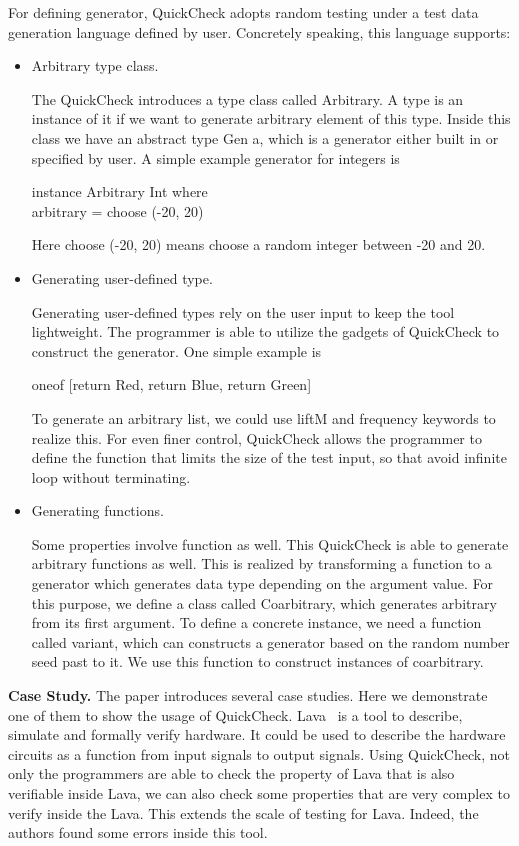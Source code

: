 \documentclass[12pt]{article}
\begin{document}
For defining generator, QuickCheck adopts random testing under a test data generation language defined by user. Concretely speaking, this language supports:
\begin{itemize}
\item Arbitrary type class.

The QuickCheck introduces a type class called Arbitrary. A type is an instance of it if we want to generate arbitrary element of this type. Inside this class we have an abstract type Gen a, which is a generator either built in or specified by user. A simple example generator for integers is
\begin{center}
	instance Arbitrary Int where\\
	arbitrary = choose (-20, 20)
\end{center}
Here choose (-20, 20) means choose a random integer between -20 and 20.

\item Generating user-defined type.

Generating user-defined types rely on the user input to keep the tool lightweight. The programmer is able to utilize the gadgets of QuickCheck to construct the generator. One simple example is
\begin{center}
	oneof [return Red, return Blue, return Green]
\end{center}

To generate an arbitrary list, we could use liftM and frequency keywords to realize this. For even finer control, QuickCheck allows the programmer to define the function that limits the size of the test input, so that avoid infinite loop without terminating.


\item Generating functions.

Some properties involve function as well. This QuickCheck is able to generate arbitrary functions as well. This is realized by transforming a function to a generator which generates data type depending on the argument value. For this purpose, we define a class called Coarbitrary, which generates arbitrary from its first argument. To define a concrete instance, we need a function called variant, which can constructs a generator based on the random number seed past to it. We use this function to construct instances of coarbitrary.

\end{itemize}


\noindent
\textbf{Case Study.}
The paper introduces several case studies. Here we demonstrate one of them to show the usage of QuickCheck. Lava~\cite{bjesse1998lava} is a tool to describe, simulate and formally verify hardware. It could be used to describe the hardware circuits as a function from input signals to output signals. Using QuickCheck, not only the programmers are able to check the property of Lava that is also verifiable inside Lava, we can also check some properties that are very complex to verify inside the Lava. This extends the scale of testing for Lava. Indeed, the authors found some errors inside this tool.
\end{document}
